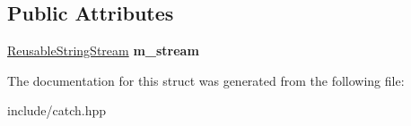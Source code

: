 \subsection*{Public Attributes}
\begin{DoxyCompactItemize}
\item 
\hyperlink{classCatch_1_1ReusableStringStream}{Reusable\+String\+Stream} {\bfseries m\+\_\+stream}\hypertarget{structCatch_1_1MessageStream_a9202520faed8882ef469db9f353ec578}{}\label{structCatch_1_1MessageStream_a9202520faed8882ef469db9f353ec578}

\end{DoxyCompactItemize}


The documentation for this struct was generated from the following file\+:\begin{DoxyCompactItemize}
\item 
include/catch.\+hpp\end{DoxyCompactItemize}
